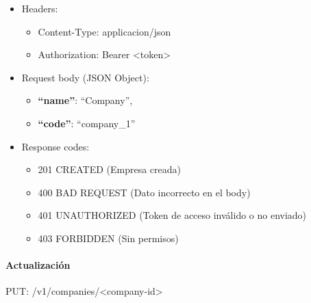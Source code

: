 \documentclass[12pt,a4paperpaper,]{report}
\providecommand{\tightlist}{%
  \setlength{\itemsep}{0pt}\setlength{\parskip}{0pt}}
\let\oldparagraph\paragraph
\renewcommand{\paragraph}[1]{\oldparagraph{#1}\mbox{}}
\begin{document}
\begin{itemize}
\tightlist
\item
  Headers:

  \begin{itemize}
  \tightlist
  \item
    Content-Type: applicacion/json
  \item
    Authorization: Bearer \textless{}token\textgreater{}
  \end{itemize}
\item
  Request body (JSON Object):

  \begin{itemize}
  \tightlist
  \item
    \textbf{``name''}: ``Company'',
  \item
    \textbf{``code''}: ``company\_1''
  \end{itemize}
\item
  Response codes:

  \begin{itemize}
  \tightlist
  \item
    201 CREATED (Empresa creada)
  \item
    400 BAD REQUEST (Dato incorrecto en el body)
  \item
    401 UNAUTHORIZED (Token de acceso inválido o no enviado)
  \item
    403 FORBIDDEN (Sin permisos)
  \end{itemize}
\end{itemize}

\paragraph{Actualización}\label{actualizaciuxf3n}

PUT: /v1/companies/\textless{}company-id\textgreater{}
\end{document}
